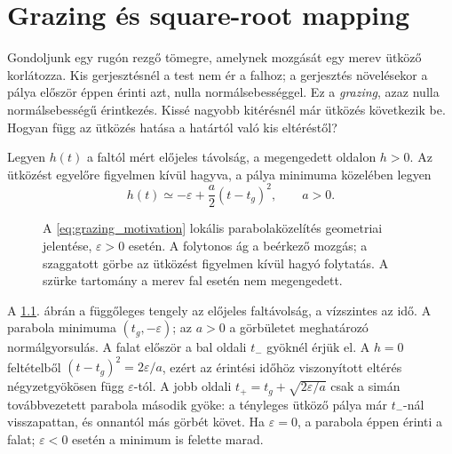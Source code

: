 \chapter{\label{sec:square_root}Grazing és square-root mapping}

Gondoljunk egy rugón rezgő tömegre, amelynek mozgását egy merev ütköző korlátozza. Kis gerjesztésnél a test nem ér a falhoz; a gerjesztés növelésekor a pálya először éppen érinti azt, nulla normálsebességgel. Ez a \emph{grazing}, azaz nulla normálsebességű érintkezés. Kissé nagyobb kitérésnél már ütközés következik be. Hogyan függ az ütközés hatása a határtól való kis eltéréstől?

Legyen $h(t)$ a faltól mért előjeles távolság, a megengedett oldalon $h>0$. Az ütközést egyelőre figyelmen kívül hagyva, a pálya minimuma közelében legyen
\begin{equation}\label{eq:grazing_motivation}
h(t)\simeq-\varepsilon+\frac{a}{2}(t-t_g)^2,\qquad a>0.
\end{equation}
\begin{figure}[htbp]\centering

\caption{A \eqref{eq:grazing_motivation} lokális parabolaközelítés geometriai jelentése, $\varepsilon>0$ esetén. A folytonos ág a beérkező mozgás; a szaggatott görbe az ütközést figyelmen kívül hagyó folytatás. A szürke tartomány a merev fal esetén nem megengedett.}\label{fig:grazing_parabola}
\end{figure}
A \ref{fig:grazing_parabola}. ábrán a függőleges tengely az előjeles faltávolság, a vízszintes az idő. A parabola minimuma $(t_g,-\varepsilon)$; az $a>0$ a görbületet meghatározó normálgyorsulás. A falat először a bal oldali $t_-$ gyöknél érjük el. A $h=0$ feltételből $(t-t_g)^2=2\varepsilon/a$, ezért az érintési időhöz viszonyított eltérés négyzetgyökösen függ $\varepsilon$-tól. A jobb oldali $t_+=t_g+\sqrt{2\varepsilon/a}$ csak a simán továbbvezetett parabola második gyöke: a tényleges ütköző pálya már $t_-$-nál visszapattan, és onnantól más görbét követ. Ha $\varepsilon=0$, a parabola éppen érinti a falat; $\varepsilon<0$ esetén a minimum is felette marad.

